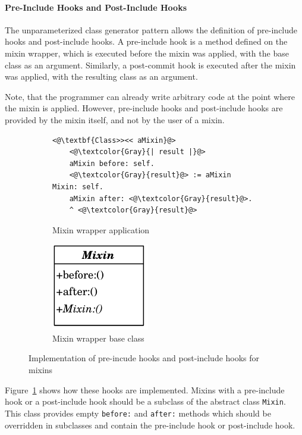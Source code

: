\paragraph{Pre-Include Hooks and Post-Include Hooks}
The unparameterized class generator pattern allows the definition of pre-include hooks and post-include hooks. A pre-include hook is a method defined on the mixin wrapper, which is executed before the mixin was applied, with the base class as an argument. Similarly, a post-commit hook is executed after the mixin was applied, with the resulting class as an argument. 

Note, that the programmer can already write arbitrary code at the point where the mixin is applied. However, pre-include hooks and post-include hooks are provided by the mixin itself, and not by the user of a mixin.

\begin{figure}[!htp]
\centering
\begin{subfigure}[b]{0.45\textwidth}
\begin{lstlisting}
<@\textbf{Class>><< aMixin}@>
    <@\textcolor{Gray}{| result |}@>
    aMixin before: self.
    <@\textcolor{Gray}{result}@> := aMixin Mixin: self.
    aMixin after: <@\textcolor{Gray}{result}@>.
    ^ <@\textcolor{Gray}{result}@>
\end{lstlisting}
\caption{Mixin wrapper application}
\end{subfigure}
\qquad
\begin{subfigure}[b]{0.45\textwidth}
	\centering
	\includegraphics[scale=1]{abstract_mixin_classgen.pdf}
	\caption{Mixin wrapper base class}
\end{subfigure}
\caption{Implementation of pre-incude hooks and post-include hooks for mixins}
\label{fig:usecase_prepostincl}
\end{figure}

Figure~\ref{fig:usecase_prepostincl} shows how these hooks are implemented. Mixins with a pre-include hook or a post-include hook should be a subclass of the abstract class \texttt{Mixin}. This class provides empty \texttt{before:} and \texttt{after:} methods which should be overridden in subclasses and contain the pre-include hook or post-include hook.


